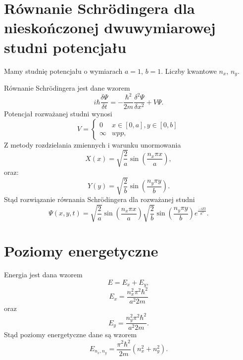 \documentclass[11pt,a4paper,oneside]{article}
\begin{document}
\section{Równanie Schrödingera dla nieskończonej dwuwymiarowej studni potencjału}
	Mamy studnię potencjału o wymiarach $a=1$, $b=1$. Liczby kwantowe $n_{x}$, $n_{y}$.
	\newline
	
	\noindent Równanie Schrödingera jest dane wzorem
	\begin{equation}
		i\hbar \frac{\delta \Psi}{\delta t} = -\frac{\hbar^{2}}{2m}\frac{\delta ^{2} \Psi}{\delta x ^{2}}+V \Psi.
	\end{equation}
	Potencjał rozważanej studni wynosi
	\begin{equation}
			V =
			\begin{cases}
				0 & x\in [0, a], y\in [0, b]\\
				\infty & wpp,
			\end{cases} 
	\end{equation}
	Z metody rozdzielania zmiennych i warunku unormowania
	\begin{equation}
		X(x) = \sqrt{\frac{2}{a}}\sin \left(\frac{n_{x}\pi x}{a}\right ),
	\end{equation}
	oraz:
	\begin{equation}
		Y(y) = \sqrt{\frac{2}{b}}\sin \left(\frac{n_{y}\pi y}{b}\right ).
	\end{equation}
	Stąd rozwiązanie równania Schrödingera dla rozważanej studni
	\begin{equation}
		\Psi (x, y, t) = \sqrt{\frac{2}{a}}\sin \left(\frac{n_{x}\pi x}{a}\right )\sqrt{\frac{2}{b}}\sin \left(\frac{n_{y}\pi y}{b}\right )e^{\frac{-iEt}{\hbar ^{2}}}.
	\end{equation}
\section{Poziomy energetyczne}
	Energia jest dana wzorem
	\begin{equation}
		E = E_{x}+E_{y},
	\end{equation}
	\begin{equation}
		E_{x} = \frac{n_{x} ^{2} \pi ^{2} \hbar ^{2}}{a^{2} 2 m}
	\end{equation}
	oraz
	\begin{equation}
		E_{y} = \frac{n_{y} ^{2} \pi ^{2} \hbar ^{2}}{a^{2} 2 m}.
	\end{equation}
	Stąd poziomy energetyczne dane są wzorem
	\begin{equation}
		E_{n_{x}, n_{y}} = \frac{\pi ^{2} \hbar ^{2}}{2m} (n_{x}^2+n_{y}^{2}).
	\end{equation}
\end{document}
